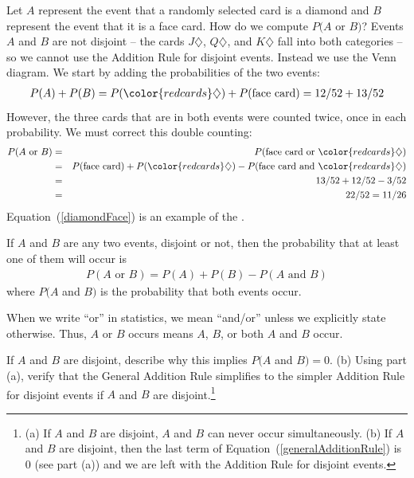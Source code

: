 Let $A$ represent the event that a randomly selected card is a diamond and $B$ represent the event that it is a face card. How do we compute $P(A$ or $B)$? Events $A$ and $B$ are not disjoint -- the cards {\color{redcards}$J\diamondsuit$}, {\color{redcards}$Q\diamondsuit$}, and {\color{redcards}$K\diamondsuit$} fall into both categories -- so we cannot use the Addition Rule for disjoint events. Instead we use the Venn diagram. We start by adding the probabilities of the two events:
\begin{eqnarray*}
P(A) + P(B) = P({\color{redcards}\diamondsuit}) + P(\text{face card}) = 12/52 + 13/52
\label{overCountFaceDiamond}
\end{eqnarray*}
However, the three cards that are in both events were counted twice, once in each probability. We must correct this double counting:
\begin{eqnarray}
P(A\text{ or } B) &=&P(\text{face card or }{\color{redcards}\diamondsuit})  \notag \\
 &=& P(\text{face card}) + P({\color{redcards}\diamondsuit}) - P(\text{face card and }{\color{redcards}\diamondsuit}) \label{diamondFace} \\
 &=& 13/52 + 12/52 - 3/52 \notag \\
 &=& 22/52 = 11/26 \notag
\end{eqnarray}
Equation~(\ref{diamondFace}) is an example of the . 

\begin{termBox}{ If $A$ and $B$ are any two events, disjoint or not, then the probability that at least one of them will occur is
\begin{eqnarray}
P(A\text{ or }B) = P(A) + P(B) - P(A\text{ and }B)
\label{generalAdditionRule}
\end{eqnarray}
where $P(A$ and $B)$ is the probability that both events occur.}
\end{termBox}

\begin{tipBox}{
When we write ``or'' in statistics, we mean ``and/or'' unless we explicitly state otherwise. Thus, $A$ or $B$ occurs means $A$, $B$, or both $A$ and $B$ occur.}
\end{tipBox}

\begin{exercise}
If $A$ and $B$ are disjoint, describe why this implies $P(A$ and $B) = 0$. (b) Using part (a), verify that the General Addition Rule simplifies to the simpler Addition Rule for disjoint events if $A$ and $B$ are disjoint.\footnote{(a) If $A$ and $B$ are disjoint, $A$ and $B$ can never occur simultaneously. (b) If $A$ and $B$ are disjoint, then the last term of Equation~(\ref{generalAdditionRule}) is 0 (see part (a)) and we are left with the Addition Rule for disjoint events.}
\end{exercise}

